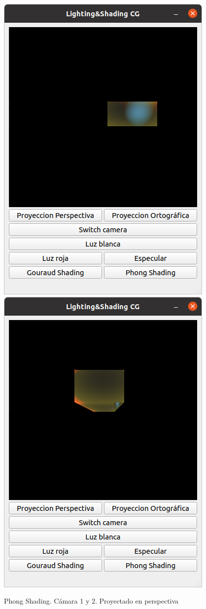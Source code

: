 \documentclass[12pt]{article}
\begin{document}
\begin{figure}[H]
\centering
\includegraphics[scale=0.5]{images/ej3.png}
\includegraphics[scale=0.5]{images/ej4.png}
\caption{Phong Shading. Cámara 1 y 2. Proyectado en perspectiva}
\end{figure}
\end{document}
